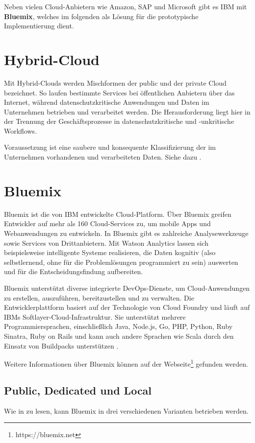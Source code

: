 Neben vielen Cloud-Anbietern wie Amazon, SAP und Microsoft gibt es IBM mit \textbf{Bluemix}, welches im folgenden als Lösung für
die prototypische Implementierung dient.

\section{Hybrid-Cloud}
Mit Hybrid-Clouds werden Mischformen der public und der private Cloud bezeichnet. So laufen bestimmte Services bei
öffentlichen Anbietern über das Internet, während datenschutzkritische Anwendungen und Daten im Unternehmen betrieben
und verarbeitet werden. Die Herausforderung liegt hier in der Trennung der Geschäftsprozesse in datenschutzkritische
und -unkritische Workflows.

Voraussetzung ist eine saubere und konsequente Klassifizierung der im Unternehmen vorhandenen und verarbeiteten
Daten. Siehe dazu \cite{online_grundlagen_hybriddcloud}.

\section{Bluemix}
Bluemix ist die von IBM entwickelte Cloud-Platform. Über Bluemix greifen Entwickler auf mehr als 160 Cloud-Services zu,
um mobile Apps und Webanwendungen zu entwickeln. In Bluemix gibt es zahlreiche Analysewerkzeuge sowie Services von
Drittanbietern. Mit Watson Analytics lassen sich beispielsweise intelligente Systeme realisieren, die Daten
kognitiv (also selbstlernend, ohne für die Problemlösungen programmiert zu sein) auswerten und für die Entscheidungsfindung
aufbereiten.

Bluemix unterstützt diverse integrierte DevOps-Dienste, um Cloud-Anwendungen zu erstellen, auszuführen, bereitzustellen
und zu verwalten. Die Entwicklerplattform basiert auf der Technologie von Cloud Foundry und läuft auf IBMs
Softlayer-Cloud-Infrastruktur. Sie unterstützt mehrere Programmiersprachen, einschließlich Java, Node.js, Go, PHP, Python,
Ruby Sinatra, Ruby on Rails und kann auch andere Sprachen wie Scala durch den Einsatz von Buildpacks unterstützen
\cite{online_grundlagen_bluemix}.

Weitere Informationen über Bluemix können auf der Webseite\footnote{https://bluemix.net} gefunden werden.

\subsection{Public, Dedicated und Local}
Wie in \cite{online_grundlagen_bluemix_pdl} zu lesen, kann Bluemix in drei verschiedenen Varianten betrieben werden.

